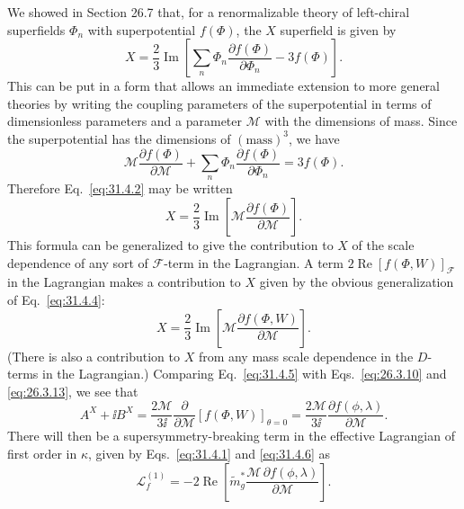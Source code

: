 We showed in Section 26.7 that, for a renormalizable theory of left-chiral
superfields \(\Phi_n\) with superpotential \(f(\Phi)\), the \(X\) superfield
is given by
\begin{equation}
  X=\frac23\operatorname{Im}
  \left[
    \sum_n\Phi_n\frac{\partial f(\Phi)}{\partial\Phi_n}
    -3f(\Phi)
  \right].
  \tag{31.4.2}\label{eq:31.4.2}
\end{equation}
This can be put in a form that allows an immediate extension to more
general theories by writing the coupling parameters of the superpotential
in terms of dimensionless parameters and a parameter \(\mathcal M\) with
the dimensions of mass. Since the superpotential has the dimensions of
\((\mathrm{mass})^3\), we have
\begin{equation}
  \mathcal M\frac{\partial f(\Phi)}{\partial\mathcal M}
  +\sum_n\Phi_n\frac{\partial f(\Phi)}{\partial\Phi_n}
  =3f(\Phi).
  \tag{31.4.3}\label{eq:31.4.3}
\end{equation}
Therefore Eq.~\eqref{eq:31.4.2} may be written
\begin{equation}
  X=\frac23\operatorname{Im}
  \left[
    \mathcal M\frac{\partial f(\Phi)}{\partial\mathcal M}
  \right].
  \tag{31.4.4}\label{eq:31.4.4}
\end{equation}
This formula can be generalized to give the contribution to \(X\) of the
scale dependence of any sort of \(\mathcal F\)-term in the Lagrangian. A
term \(2\operatorname{Re}[f(\Phi,W)]_{\mathcal F}\) in the Lagrangian makes
a contribution to \(X\) given by the obvious generalization of
Eq.~\eqref{eq:31.4.4}:
\begin{equation}
  X=\frac23\operatorname{Im}
  \left[
    \mathcal M\frac{\partial f(\Phi,W)}{\partial\mathcal M}
  \right].
  \tag{31.4.5}\label{eq:31.4.5}
\end{equation}
(There is also a contribution to \(X\) from any mass scale dependence in
the \(D\)-terms in the Lagrangian.) Comparing Eq.~\eqref{eq:31.4.5} with
Eqs.~\eqref{eq:26.3.10} and \eqref{eq:26.3.13}, we see that
\begin{equation}
  A^X+\ii B^X
  =\frac{2\mathcal M}{3\ii}\frac{\partial}{\partial\mathcal M}
   [f(\Phi,W)]_{\theta=0}
  =\frac{2\mathcal M}{3\ii}
   \frac{\partial f(\phi,\lambda)}{\partial\mathcal M}.
  \tag{31.4.6}\label{eq:31.4.6}
\end{equation}
There will then be a supersymmetry-breaking term in the effective
Lagrangian of first order in \(\kappa\), given by
Eqs.~\eqref{eq:31.4.1} and \eqref{eq:31.4.6} as
\begin{equation}
  \mathcal L_f^{(1)}
  =-2\operatorname{Re}
  \left[
    \widetilde m_g^*
    \frac{\mathcal M\,\partial f(\phi,\lambda)}
         {\partial\mathcal M}
  \right].
  \tag{31.4.7}\label{eq:31.4.7}
\end{equation}

